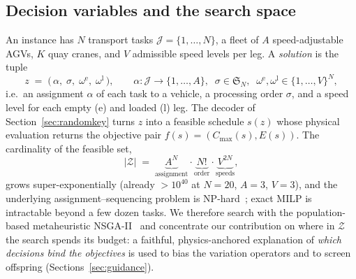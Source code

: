 \documentclass[11pt]{article}
\newcommand{\Cmax}{C_{\max}}
\begin{document}
\subsection{Decision variables and the search space}
\label{sec:searchspace}
An instance has $N$ transport tasks $\mathcal{J}=\{1,\dots,N\}$, a fleet of $A$
speed-adjustable AGVs, $K$ quay cranes, and $V$ admissible speed levels per leg. A
\emph{solution} is the tuple
\begin{equation}
z \;=\; \big(\,\alpha,\;\sigma,\;\omega^{\mathrm e},\;\omega^{\mathrm l}\,\big),\qquad
\alpha:\mathcal{J}\!\to\!\{1,\dots,A\},\;\;
\sigma\in\mathfrak{S}_N,\;\;
\omega^{\mathrm e},\omega^{\mathrm l}\in\{1,\dots,V\}^{N},
\label{eq:solution}
\end{equation}
i.e.\ an assignment $\alpha$ of each task to a vehicle, a processing order $\sigma$, and a
speed level for each empty (e) and loaded (l) leg. The decoder of
Section~\ref{sec:randomkey} turns $z$ into a feasible schedule $s(z)$ whose physical
evaluation returns the objective pair $f(s)=(\Cmax(s),E(s))$. The cardinality of the
feasible set,
\begin{equation}
|\mathcal{Z}| \;=\; \underbrace{A^{N}}_{\text{assignment}}\cdot
\underbrace{N!}_{\text{order}}\cdot
\underbrace{V^{2N}}_{\text{speeds}},
\end{equation}
grows super-exponentially (already $>10^{40}$ at $N{=}20$, $A{=}3$, $V{=}3$), and the
underlying assignment--sequencing problem is NP-hard~\cite{fontes2022mpbrkga}; exact MILP is
intractable beyond a few dozen tasks. We therefore search with the population-based
metaheuristic NSGA-II~\cite{deb2002nsga2} and concentrate our contribution on where
in $\mathcal Z$ the search spends its budget: a faithful, physics-anchored explanation of
\emph{which decisions bind the objectives} is used to bias the variation operators and to
screen offspring (Sections~\ref{sec:guidance}).
\end{document}
